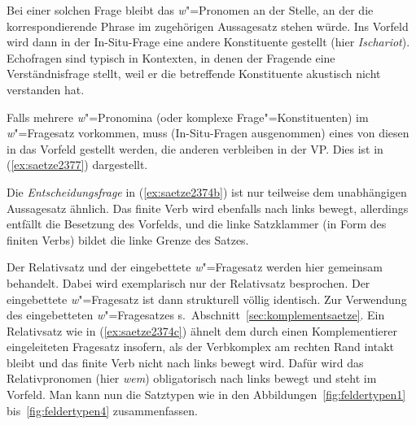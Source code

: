 \begin{exe}
  \ex\label{ex:saetze2375}
  \begin{xlist}
  \end{xlist}
\end{exe}

Bei einer solchen Frage bleibt das \textit{w}"=Pronomen an der Stelle, an der die korrespondierende Phrase im zugehörigen Aussagesatz stehen würde.
Ins Vorfeld wird dann in der In-Situ-Frage eine andere Konstituente gestellt (hier \zB \textit{Ischariot}).
Echofragen sind typisch in Kontexten, in denen der Fragende eine Verständnisfrage stellt, weil er die betreffende Konstituente akustisch nicht verstanden hat.

Falls mehrere \textit{w}"=Pronomina (oder komplexe Frage"=Konstituenten) im \textit{w}"=Fragesatz vorkommen, muss (In-Situ-Fragen ausgenommen) eines von diesen in das Vorfeld gestellt werden, die anderen verbleiben in der VP.
Dies ist in (\ref{ex:saetze2377}) dargestellt.

\begin{exe}
  \ex\label{ex:saetze2377}
  \begin{xlist}
  \end{xlist}
\end{exe}

Die \textit{Entscheidungsfrage} in (\ref{ex:saetze2374b}) ist nur teilweise dem unabhängigen Aussagesatz ähnlich.
Das finite Verb wird ebenfalls nach links bewegt, allerdings entfällt die Besetzung des Vorfelds, und die linke Satzklammer (in Form des finiten Verbs) bildet die linke Grenze des Satzes.


Der Relativsatz und der eingebettete \textit{w}"=Fragesatz werden hier gemeinsam behandelt.
Dabei wird exemplarisch nur der Relativsatz besprochen.
Der eingebettete \textit{w}"=Fragesatz ist dann strukturell völlig identisch.
Zur Verwendung des eingebetteten \textit{w}"=Fragesatzes s.\ Abschnitt~\ref{sec:komplementsaetze}.
Ein Relativsatz wie in (\ref{ex:saetze2374c}) ähnelt dem durch einen Komplementierer eingeleiteten Fragesatz insofern, als der Verbkomplex am rechten Rand intakt bleibt und das finite Verb nicht nach links bewegt wird.
Dafür wird das Relativpronomen (hier \textit{wem}) obligatorisch nach links bewegt und steht im Vorfeld.
Man kann nun die Satztypen wie in den Abbildungen~\ref{fig:feldertypen1} bis~\ref{fig:feldertypen4} zusammenfassen.

